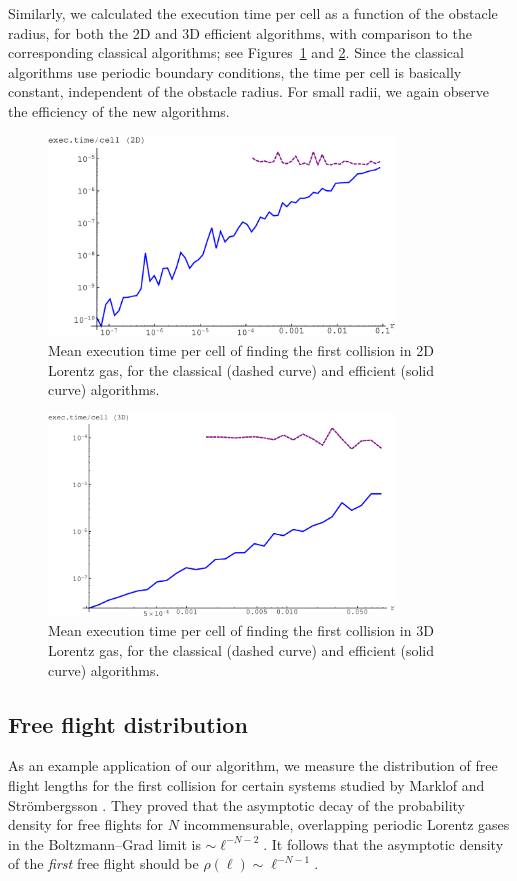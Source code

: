 \documentclass{iopart}
\begin{document}
Similarly, we calculated the execution time per cell as a function of the obstacle radius, for both the 2D and 3D efficient algorithms, with comparison to the corresponding classical algorithms; see Figures~\ref{fig:exectimepercell2D} and \ref{fig:exectimepercell3D}. Since the classical algorithms use periodic boundary conditions, the time per cell is basically constant, independent of the obstacle radius. 
For small radii, we again observe the efficiency of the new algorithms.

\begin{figure}
\centering
\includegraphics [width=260pt]{exectimepercell-2D.pdf}
\caption{Mean execution time per cell of finding the first collision in 2D Lorentz gas, for the classical (dashed curve) and efficient (solid curve) algorithms.}
\label{fig:exectimepercell2D}
\end{figure}

\begin{figure}
\centering
\includegraphics [width=260pt]{exectimepercell-3D.pdf}
\caption{Mean execution time per cell of finding the first collision in 3D Lorentz gas, for the classical (dashed curve) and efficient (solid curve) algorithms.}
\label{fig:exectimepercell3D}
\end{figure}

\subsection{Free flight distribution}
As an example application of our algorithm, we measure the distribution of free flight lengths for the first collision for certain systems studied by Marklof and Str\"ombergsson \cite{marklof2014power}. They proved that the asymptotic decay of the probability density for free flights for $N$ incommensurable, overlapping periodic Lorentz gases in the Boltzmann--Grad limit is $\sim \ell^{-N-2}$. It follows that the asymptotic density of the \emph{first} free flight should be 
$\rho(\ell) \sim \ell^{-N-1}$.
\end{document}
